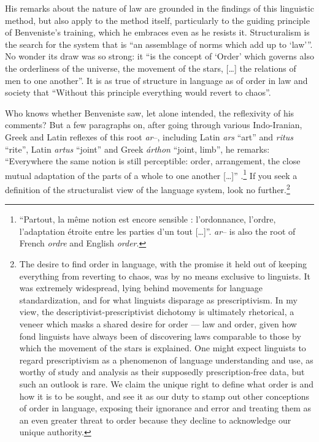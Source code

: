 \documentclass[output=paper]{langscibook}
\begin{document}
His remarks about the nature of law are grounded in the findings of this linguistic method, but also apply to the method itself, particularly to the guiding principle of Benveniste's training, which he embraces even as he resists it. Structuralism is the search for the system that is ``an assemblage of norms which add up to `law'\thinspace''. No wonder its draw was so strong: it ``is the concept of `Order' which governs also the orderliness of the universe, the movement of the stars, […] the relations of men to one another''. It is as true of structure in language as of order in law and society that ``Without this principle everything would revert to chaos''.

Who knows whether Benveniste saw, let alone intended, the reflexivity of his comments? But a few paragraphs on, after going through various Indo-Iranian, Greek and Latin reflexes of this root \emph{ar}--, including Latin \emph{ars} ``art'' and \emph{ritus} ``rite'', Latin \emph{artus} ``joint'' and Greek \emph{árthon} ``joint, limb'', he remarks: ``Everywhere the same notion is still perceptible: order, arrangement, the close mutual adaptation of the parts of a whole to one another […]'' \citep[101]{Benveniste1969vocabulaire}.\footnote{``Partout, la même notion est encore sensible : l'ordonnance, l'ordre, l'adaptation étroite entre les parties d'un tout […]''. \emph{ar}-- is also the root of French \emph{ordre} and English \emph{order}.} If you seek a definition of the structuralist view of the language system, look no further.\footnote{The desire to find order in language, with the promise it held out of keeping everything from reverting to chaos, was by no means exclusive to linguists. It was extremely widespread, lying behind movements for language standardization, and for what linguists disparage as prescriptivism. In my view, the descriptivist-prescriptivist dichotomy is ultimately rhetorical, a veneer which masks a shared desire for order — law and order, given how fond linguists have always been of discovering laws comparable to those by which the movement of the stars is explained. One might expect linguists to regard prescriptivism as a phenomenon of language understanding and use, as worthy of study and analysis as their supposedly prescription-free data, but such an outlook is rare. We claim the unique right to define what order is and how it is to be sought, and see it as our duty to stamp out other conceptions of order in language, exposing their ignorance and error and treating them as an even greater threat to order because they decline to acknowledge our unique authority.}
\end{document}
